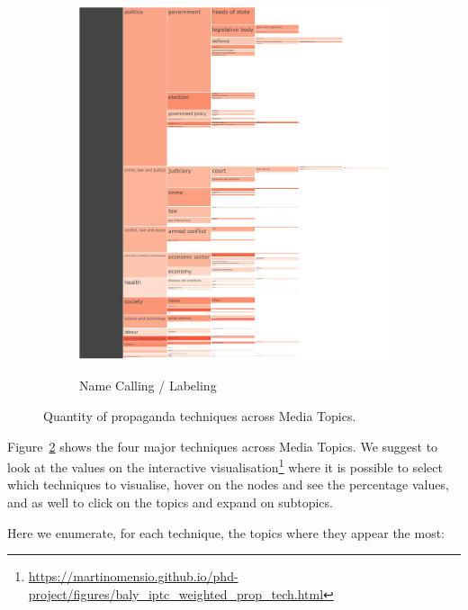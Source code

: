 \begin{figure}[!htbp]
\begin{subfigure}{0.45\textwidth}
		\href{https://martinomensio.github.io/phd-project/figures/baly_iptc_weighted_prop_tech.html#Name_Calling-Labeling}{\includegraphics[trim={2.65cm 0cm 0cm 0cm},clip,width=\linewidth]{figures/baly_iptc_weighted_prop_tech_Name_Calling-Labeling.pdf}}
		\caption{Name Calling / Labeling}
            \label{fig:baly_iptc_weighted_prop_tech_Name_Calling-Labeling}
	\end{subfigure}
	
    \caption{Quantity of propaganda techniques across Media Topics.}
    \label{fig:baly_iptc_weighted_prop_tech}
\end{figure}

Figure~\ref{fig:baly_iptc_weighted_prop_tech} shows the four major techniques across Media Topics. We suggest to look at the values on the interactive visualisation\footnote{\url{https://martinomensio.github.io/phd-project/figures/baly_iptc_weighted_prop_tech.html}} where it is possible to select which techniques to visualise, hover on the nodes and see the percentage values, and as well to click on the topics and expand on subtopics.

Here we enumerate, for each technique, the topics where they appear the most:

